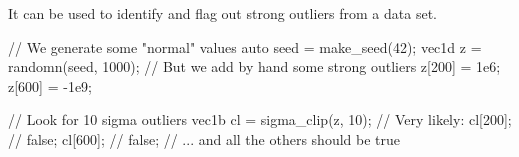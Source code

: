 It can be used to identify and flag out strong outliers from a data set.

\begin{example}
\begin{cppcode}
// We generate some "normal" values
auto seed = make_seed(42);
vec1d z = randomn(seed, 1000);
// But we add by hand some strong outliers
z[200] = 1e6;
z[600] = -1e9;

// Look for 10 sigma outliers
vec1b cl = sigma_clip(z, 10);
// Very likely:
cl[200]; // false;
cl[600]; // false;
// ... and all the others should be true
\end{cppcode}
\end{example}
